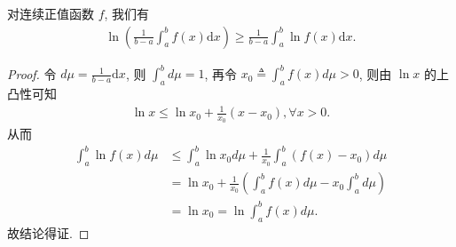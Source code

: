 \documentclass[../../main.tex]{subfiles}
\begin{document}
\begin{example}
对连续正值函数 $f$, 我们有
\begin{align*}
\ln\left(\frac{1}{b - a}\int_a^b f(x)\mathrm{d}x\right) \geqslant \frac{1}{b - a}\int_a^b \ln f(x)\mathrm{d}x.
\end{align*} 
\end{example}
\begin{proof}
令 $d\mu = \frac{1}{b - a}\mathrm{d}x$, 则 $\int_a^b d\mu = 1$, 再令 $x_0 \triangleq \int_a^b f(x) d\mu>0$, 则由 $\ln x$ 的上凸性可知
\begin{align*}
\ln x \leqslant \ln x_0 + \frac{1}{x_0}(x - x_0), \forall x > 0.
\end{align*}
从而
\begin{align*}
\int_a^b \ln f(x) d\mu &\leqslant \int_a^b \ln x_0 d\mu + \frac{1}{x_0}\int_a^b (f(x) - x_0) d\mu \\
&= \ln x_0 + \frac{1}{x_0}\left(\int_a^b f(x) d\mu - x_0\int_a^b d\mu\right) \\
&= \ln x_0 = \ln \int_a^b f(x) d\mu.
\end{align*}
故结论得证.
\end{proof}
\end{document}
